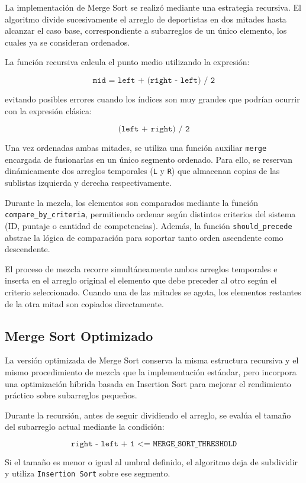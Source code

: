 La implementación de Merge Sort se realizó mediante una estrategia recursiva. El algoritmo divide sucesivamente el arreglo de deportistas en dos mitades hasta alcanzar el caso base, correspondiente a subarreglos de un único elemento, los cuales ya se consideran ordenados.

La función recursiva calcula el punto medio utilizando la expresión:

\[
\texttt{mid = left + (right - left) / 2}
\]

evitando posibles errores cuando los índices son muy grandes que podrían ocurrir con la expresión clásica:

\[
\texttt{(left + right) / 2}
\]

Una vez ordenadas ambas mitades, se utiliza una función auxiliar \texttt{merge} encargada de fusionarlas en un único segmento ordenado. Para ello, se reservan dinámicamente dos arreglos temporales (\texttt{L} y \texttt{R}) que almacenan copias de las sublistas izquierda y derecha respectivamente.

Durante la mezcla, los elementos son comparados mediante la función \texttt{compare\_by\_criteria}, permitiendo ordenar según distintos criterios del sistema (ID, puntaje o cantidad de competencias). Además, la función \texttt{should\_precede} abstrae la lógica de comparación para soportar tanto orden ascendente como descendente.

El proceso de mezcla recorre simultáneamente ambos arreglos temporales e inserta en el arreglo original el elemento que debe preceder al otro según el criterio seleccionado. Cuando una de las mitades se agota, los elementos restantes de la otra mitad son copiados directamente.

\subsection{Merge Sort Optimizado}

La versión optimizada de Merge Sort conserva la misma estructura recursiva y el mismo procedimiento de mezcla que la implementación estándar, pero incorpora una optimización híbrida basada en Insertion Sort para mejorar el rendimiento práctico sobre subarreglos pequeños.

Durante la recursión, antes de seguir dividiendo el arreglo, se evalúa el tamaño del subarreglo actual mediante la condición:

\[
\texttt{right - left + 1 <= MERGE\_SORT\_THRESHOLD}
\]

Si el tamaño es menor o igual al umbral definido, el algoritmo deja de subdividir y utiliza \texttt{Insertion Sort} sobre ese segmento.

